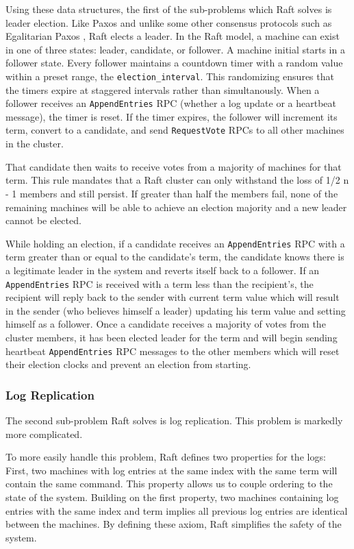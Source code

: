 Using these data structures, the first of the sub-problems which Raft solves is leader election.
Like Paxos and unlike some other consensus protocols such as Egalitarian Paxos \cite{e-paxos}, Raft elects a leader.
In the Raft model, a machine can exist in one of three states: leader, candidate, or follower.
A machine initial starts in a follower state.  Every follower maintains a countdown timer with a random value within a preset range, the \texttt{election\_interval}.  This randomizing ensures that the timers expire at staggered intervals rather than simultanously.  When a follower receives an \texttt{AppendEntries} RPC (whether a log update or a heartbeat message), the timer is reset.  If the timer expires, the follower will increment its term, convert to a candidate, and send \texttt{RequestVote} RPCs to all other machines in the cluster.

That candidate then waits to receive votes from a majority of machines for that term.  This rule mandates that a Raft cluster can only withstand the loss of 1/2 n - 1 members and still persist.  If greater than half the members fail, none of the remaining machines will be able to achieve an election majority and a new leader cannot be elected.
 
While holding an election, if a candidate receives an \texttt{AppendEntries} RPC with a term greater than or equal to the candidate's term, the candidate knows there is a legitimate leader in the system and reverts itself back to a follower.
If an \texttt{AppendEntries} RPC is received with a term less than the recipient's, the recipient will reply back to the sender with current term value which will result in the sender (who believes himself a leader) updating his term value and setting himself as a follower.
Once a candidate receives a majority of votes from the cluster members, it has been elected leader for the term and will begin sending heartbeat \texttt{AppendEntries} RPC messages to the other members which will reset their election clocks and prevent an election from starting.

\subsubsection{Log Replication}

The second sub-problem Raft solves is log replication.
This problem is markedly more complicated.

To more easily handle this problem, Raft defines two properties for the logs:
First, two machines with log entries at the same index with the same term will contain the same command.
This property allows us to couple ordering to the state of the system.
Building on the first property, two machines containing log entries with the same index and term implies all previous log entries are identical between the machines.
By defining these axiom, Raft simplifies the safety of the system.

